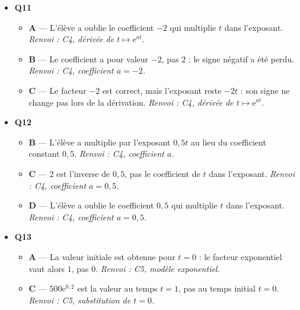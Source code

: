 \begin{itemize}
  \begin{itemize}
    \item \textbf{A} — L'élève a oublie le facteur constant $3$ : la dérivée de $t\mapsto\mathrm{e}^{at}$ est $t\mapsto a\mathrm{e}^{at}$. \emph{Renvoi : C4, dérivée de $t\mapsto\mathrm{e}^{at}$.}
    \item \textbf{B} — L'élève a multiplie par l'exposant $3t$ au lieu du coefficient constant $3$. \emph{Renvoi : C4, coefficient $a$.}
    \item \textbf{D} — Le facteur $3$ est correct, mais la fonction exponentielle conserve la variable : $\mathrm{e}^{3t}$ ne devient pas $\mathrm{e}^3$. \emph{Renvoi : C4, dérivée de $t\mapsto\mathrm{e}^{at}$.}
  \end{itemize}
  \item \textbf{Q11}
  \begin{itemize}
    \item \textbf{A} — L'élève a oublie le coefficient $-2$ qui multiplie $t$ dans l'exposant. \emph{Renvoi : C4, dérivée de $t\mapsto\mathrm{e}^{at}$.}
    \item \textbf{B} — Le coefficient a pour valeur $-2$, pas $2$ : le signe négatif a été perdu. \emph{Renvoi : C4, coefficient $a=-2$.}
    \item \textbf{C} — Le facteur $-2$ est correct, mais l'exposant reste $-2t$ : son signe ne change pas lors de la dérivation. \emph{Renvoi : C4, dérivée de $t\mapsto\mathrm{e}^{at}$.}
  \end{itemize}
  \item \textbf{Q12}
  \begin{itemize}
    \item \textbf{B} — L'élève a multiplie par l'exposant $0{,}5t$ au lieu du coefficient constant $0{,}5$. \emph{Renvoi : C4, coefficient $a$.}
    \item \textbf{C} — $2$ est l'inverse de $0{,}5$, pas le coefficient de $t$ dans l'exposant. \emph{Renvoi : C4, coefficient $a=0{,}5$.}
    \item \textbf{D} — L'élève a oublie le coefficient $0{,}5$ qui multiplie $t$ dans l'exposant. \emph{Renvoi : C4, coefficient $a=0{,}5$.}
  \end{itemize}
  \item \textbf{Q13}
  \begin{itemize}
    \item \textbf{A} — La valeur initiale est obtenue pour $t=0$ : le facteur exponentiel vaut alors $1$, pas $0$. \emph{Renvoi : C5, modèle exponentiel.}
    \item \textbf{C} — $500\mathrm{e}^{0{,}2}$ est la valeur au temps $t=1$, pas au temps initial $t=0$. \emph{Renvoi : C5, substitution de $t=0$.}

\end{itemize}
\end{itemize}
